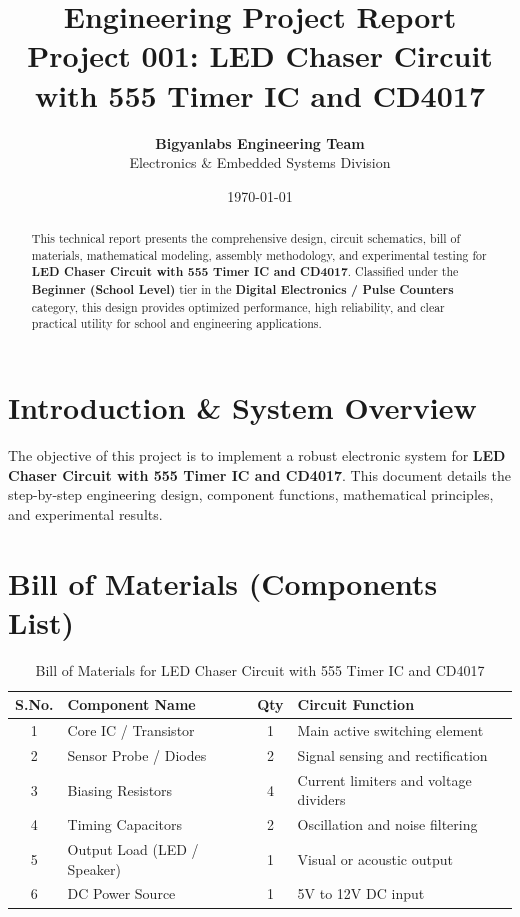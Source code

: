 \documentclass[11pt,a4paper]{article}
\title{\textbf{\Huge Engineering Project Report}\\[0.5em] \Large Project 001: LED Chaser Circuit with 555 Timer IC and CD4017}
\author{\textbf{Bigyanlabs Engineering Team}\\ Electronics \& Embedded Systems Division}
\date{\today}
\begin{document}
\maketitle
\thispagestyle{empty}

\begin{abstract}
This technical report presents the comprehensive design, circuit schematics, bill of materials, mathematical modeling, assembly methodology, and experimental testing for \textbf{LED Chaser Circuit with 555 Timer IC and CD4017}. Classified under the \textbf{Beginner (School Level)} tier in the \textbf{Digital Electronics / Pulse Counters} category, this design provides optimized performance, high reliability, and clear practical utility for school and engineering applications.
\end{abstract}

\newpage
\tableofcontents
\newpage

\section{Introduction \& System Overview}
The objective of this project is to implement a robust electronic system for \textbf{LED Chaser Circuit with 555 Timer IC and CD4017}. This document details the step-by-step engineering design, component functions, mathematical principles, and experimental results.

\section{Bill of Materials (Components List)}
\begin{table}[h!]
\centering
\caption{Bill of Materials for LED Chaser Circuit with 555 Timer IC and CD4017}
\vspace{0.5em}
\begin{tabular}{clcp{7cm}}
\toprule
\textbf{S.No.} & \textbf{Component Name} & \textbf{Qty} & \textbf{Circuit Function} \\
\midrule
1 & Core IC / Transistor & 1 & Main active switching element \\
2 & Sensor Probe / Diodes & 2 & Signal sensing and rectification \\
3 & Biasing Resistors & 4 & Current limiters and voltage dividers \\
4 & Timing Capacitors & 2 & Oscillation and noise filtering \\
5 & Output Load (LED / Speaker) & 1 & Visual or acoustic output \\
6 & DC Power Source & 1 & 5V to 12V DC input \\
\bottomrule
\end{tabular}
\end{table}
\end{document}
